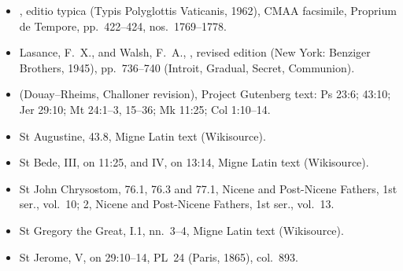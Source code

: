 {\footnotesize
\begin{itemize}\setlength{\itemsep}{0.15em}\setlength{\parskip}{0pt}
\item {}, editio typica (Typis Polyglottis Vaticanis, 1962), CMAA facsimile, Proprium de Tempore, pp.~422--424, nos.~1769--1778.
\item Lasance, F.~X., and Walsh, F.~A., , revised edition (New York: Benziger Brothers, 1945), pp.~736--740 (Introit, Gradual, Secret, Communion).
\item {} (Douay--Rheims, Challoner revision), Project Gutenberg text: Ps 23:6; 43:10; Jer 29:10; Mt 24:1--3, 15--36; Mk 11:25; Col 1:10--14.
\item St Augustine,  43.8, Migne Latin text (Wikisource).
\item St Bede,  III, on 11:25, and IV, on 13:14, Migne Latin text (Wikisource).
\item St John Chrysostom,  76.1, 76.3 and 77.1, Nicene and Post-Nicene Fathers, 1st ser., vol.~10;  2, Nicene and Post-Nicene Fathers, 1st ser., vol.~13.
\item St Gregory the Great,  I.1, nn.~3--4, Migne Latin text (Wikisource).
\item St Jerome,  V, on 29:10--14, PL~24 (Paris, 1865), col.~893.
\end{itemize}
\par}
